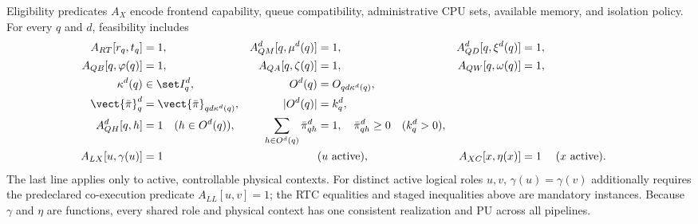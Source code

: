 Eligibility predicates $A_X$ encode frontend capability, queue compatibility, administrative CPU sets, available memory, and isolation policy. For every $q$ and $d$, feasibility includes
\begin{align}
 A_{RT}[r_q,t_q]&=1, &
 A_{QM}^{d}[q,\mu^d(q)]&=1, &
 A_{QD}^{d}[q,\xi^d(q)]&=1, \label{eq:eligibility-a}\\
 A_{QB}[q,\varphi(q)]&=1, &
 A_{QA}[q,\zeta(q)]&=1, &
 A_{QW}[q,\omega(q)]&=1, \label{eq:eligibility-b}\\
 \kappa^d(q)&\in\set I_q^d, &
 O^d(q)&=O_{qd\kappa^d(q)}, \label{eq:ownership-selection}\\
 \vect{\bar\pi}^d_q&=\vect{\bar\pi}_{qd\kappa^d(q)}, &
 |O^d(q)|&=k_q^d, \\
 A_{QH}^{d}[q,h]&=1\quad(h\in O^d(q)), &
 \sum_{h\in O^d(q)}\bar\pi^d_{qh}&=1,
 \quad \bar\pi^d_{qh}\geq0\quad(k_q^d>0), \label{eq:ownership}\\
 A_{LX}[u,\gamma(u)]&=1 &&(u\text{ active}), &
 A_{XC}[x,\eta(x)]&=1 &&(x\text{ active}). \label{eq:execution-eligibility}
\end{align}
The last line applies only to active, controllable physical contexts. For distinct active logical roles $u,v$, $\gamma(u)=\gamma(v)$ additionally requires the predeclared co-execution predicate $A_{LL}[u,v]=1$; the RTC equalities and staged inequalities above are mandatory instances. Because $\gamma$ and $\eta$ are functions, every shared role and physical context has one consistent realization and PU across all pipelines.

